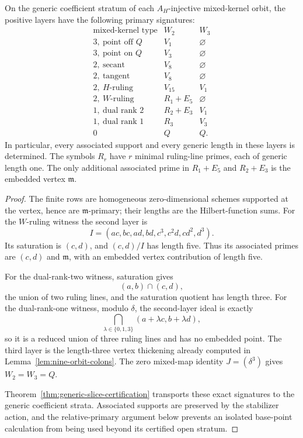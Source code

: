 \begin{theorem}
\label{thm:generic-primary-signatures}
On the generic coefficient stratum of each \(A_H\)-injective
mixed-kernel orbit, the positive layers have the following primary
signatures:
\[
\begin{array}{c|c|c}
\text{mixed-kernel type}&W_2&W_3\\ \hline
3,\ \text{point off }Q&V_1&\varnothing\\
3,\ \text{point on }Q&V_3&\varnothing\\
2,\ \text{secant}&V_8&\varnothing\\
2,\ \text{tangent}&V_8&\varnothing\\
2,\ H\text{-ruling}&V_{15}&V_1\\
2,\ W\text{-ruling}&R_1+E_5&\varnothing\\
1,\ \text{dual rank }2&R_2+E_3&V_1\\
1,\ \text{dual rank }1&R_3&V_3\\
0&Q&Q.
\end{array}
\]
In particular, every associated support and every generic length in
these layers is determined.  The symbols \(R_r\) have \(r\)
minimal ruling-line primes, each of generic length one.  The only
additional associated prime in \(R_1+E_5\) and
\(R_2+E_3\) is the embedded vertex \(\mathfrak m\).
\end{theorem}

\begin{proof}
The finite rows are homogeneous zero-dimensional schemes supported at
the vertex, hence are \(\mathfrak m\)-primary; their lengths are
the Hilbert-function sums.  For the \(W\)-ruling witness the second
layer is
\[
 I=(ac,bc,ad,bd,c^3,c^2d,cd^2,d^3).
\]
Its saturation is \((c,d)\), and \((c,d)/I\) has length five.
Thus its associated primes are \((c,d)\) and \(\mathfrak m\),
with an embedded vertex contribution of length five.

For the dual-rank-two witness, saturation gives
\[
 (a,b)\cap(c,d),
\]
the union of two ruling lines, and the saturation quotient has length
three.  For the dual-rank-one witness, modulo \(\delta\), the
second-layer ideal is exactly
\[
 \bigcap_{\lambda\in\{0,1,3\}}
 (a+\lambda c,b+\lambda d),
\]
so it is a reduced union of three ruling lines and has no embedded
point.  The third layer is the length-three vertex thickening already
computed in Lemma~\ref{lem:nine-orbit-colons}.  The zero mixed-map
identity \(J=(\delta^3)\) gives \(W_2=W_3=Q\).

Theorem~\ref{thm:generic-slice-certification} transports these exact
signatures to the generic coefficient strata.  Associated supports
are preserved by the stabilizer action, and the relative-primary
argument below prevents an isolated base-point calculation from being
used beyond its certified open stratum.
\end{proof}


